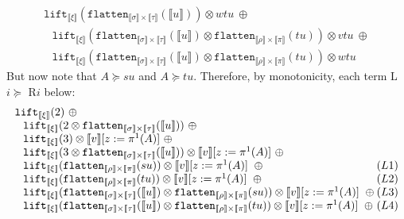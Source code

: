 \documentclass[runningheads,a4paper]{llncs}
\newcommand{\typeinterpret}[1]{\llbracket #1 \rrbracket}
\newcommand{\interpret}[1]{\llbracket #1 \rrbracket}
\newcommand{\flatten}{\mathtt{flatten}}
\newcommand{\lift}{\mathtt{lift}}
\begin{document}
\begin{itemize}
\[\begin{array}{l}
    \lift_{\typeinterpret{\xi}}(\flatten_{\typeinterpret{\sigma}
    \times \typeinterpret{\tau}}(\interpret{u})) \otimes wtu\ \oplus \\
  \phantom{A}
    \lift_{\typeinterpret{\xi}}(\flatten_{\typeinterpret{\sigma}
    \times \typeinterpret{\tau}}(\interpret{u}) \otimes
    \flatten_{\typeinterpret{\rho} \times
    \typeinterpret{\pi}}(tu)) \otimes vtu\ \oplus \\
  \phantom{A}
    \lift_{\typeinterpret{\xi}}(\flatten_{\typeinterpret{\sigma}
    \times \typeinterpret{\tau}}(\interpret{u}) \otimes
    \flatten_{\typeinterpret{\rho}
    \times \typeinterpret{\pi}}(tu)) \otimes wtu
  \end{array}
  \]
  But now note that $A \succeq su$ and $A \succeq tu$.  Therefore, by
  monotonicity, each term L$i \succeq$ R$i$ below:
  \[
  \begin{array}{l}
  \lift_{\typeinterpret{\xi}}(2)\ \oplus \\
  \phantom{A}
     \lift_{\typeinterpret{\xi}}(2 \otimes
      \flatten_{\typeinterpret{\sigma} \times \typeinterpret{\tau}}(
      \interpret{u}))\ \oplus \\
  \phantom{A}
    \lift_{\typeinterpret{\xi}}(3) \otimes \interpret{v}[z:=\pi^1(A)]
    \ \oplus \\
  \phantom{A}
    \lift_{\typeinterpret{\xi}}(3 \otimes
    \flatten_{\typeinterpret{\sigma} \times \typeinterpret{\tau}}(
    \interpret{u})) \otimes
     \interpret{v}[z:=\pi^1(A)]
    \ \oplus \\
  \phantom{A}
    \lift_{\typeinterpret{\xi}}(\flatten_{\typeinterpret{\rho} \times
    \typeinterpret{\pi}}(su)) \otimes
     \interpret{v}[z:=\pi^1(A)]
    \ \oplus \hfill (L1) \\
  \phantom{A}
    \lift_{\typeinterpret{\xi}}(\flatten_{\typeinterpret{\rho} \times
    \typeinterpret{\pi}}(tu)) \otimes
     \interpret{v}[z:=\pi^1(A)]
    \ \oplus \hfill (L2) \\
  \phantom{A}
    \lift_{\typeinterpret{\xi}}(\flatten_{\typeinterpret{\sigma} \times
    \typeinterpret{\tau}}(\interpret{u}) \otimes
    \flatten_{\typeinterpret{\rho} \times \typeinterpret{\pi}}(su))
    \otimes
     \interpret{v}[z:=\pi^1(A)]
    \ \oplus \hfill (L3) \\
  \phantom{A}
    \lift_{\typeinterpret{\xi}}(\flatten_{\typeinterpret{\sigma} \times
    \typeinterpret{\tau}}(\interpret{u}) \otimes
    \flatten_{\typeinterpret{\rho} \times \typeinterpret{\pi}}(tu))
    \otimes
     \interpret{v}[z:=\pi^1(A)]
    \ \oplus \hfill (L4) \\

\end{array}\]
\end{itemize}
\end{document}
